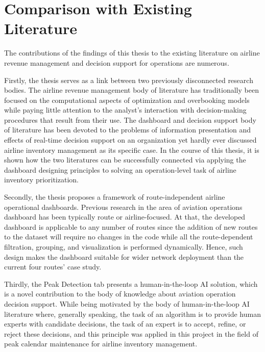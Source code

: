 \section{Comparison with Existing Literature}

The contributions of the findings of this thesis to the existing literature on airline revenue management and decision support for operations are numerous.

Firstly, the thesis serves as a link between two previously disconnected research bodies. The airline revenue management body of literature \citep{Belobaba1987, PakPiersma2002, FiigIslerHopperstadBelobaba2010} has traditionally been focused on the computational aspects of optimization and overbooking models while paying little attention to the analyst's interaction with decision-making procedures that result from their use. The dashboard and decision support body of literature \citep{YigitbasiogluVelcu2012, Rouhani2016, WatsonWixomHoffer2006} has been devoted to the problems of information presentation and effects of real-time decision support on an organization yet hardly ever discussed airline inventory management as its specific case. In the course of this thesis, it is shown how the two literatures can be successfully connected via applying the dashboard designing principles to solving an operation-level task of airline inventory prioritization.

Secondly, the thesis proposes a framework of route-independent airline operational dashboards. Previous research in the area of aviation operations dashboard \citep{RakshitKrishnamurthyYu1996, Salleh2023} has been typically route or airline-focused. At that, the developed dashboard is applicable to any number of routes since the addition of new routes to the dataset will require no changes in the code while all the route-dependent filtration, grouping, and visualization is performed dynamically. Hence, such design makes the dashboard suitable for wider network deployment than the current four routes' case study.

Thirdly, the Peak Detection tab presents a human-in-the-loop AI solution, which is a novel contribution to the body of knowledge about aviation operation decision support. While being motivated by the body of human-in-the-loop AI literature where, generally speaking, the task of an algorithm is to provide human experts with candidate decisions, the task of an expert is to accept, refine, or reject these decisions, and this principle was applied in this project in the field of peak calendar maintenance for airline inventory management.

